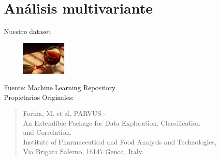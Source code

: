 \documentclass[xcolor=table]{beamer}
\begin{document}
\section{Análisis multivariante}
\begin{frame}{Nuestro dataset}

\begin{table}[]
\end{table}
\begin{figure}
\centering
\includegraphics[width=0.2\textwidth]{vino.jpg}
\end{figure}
{Fuente: Machine Learning Repository\\
Propietarios Originales: }\begin{quote}\scriptsize Forina, M. et al, PARVUS -\\
An Extendible Package for Data Exploration, Classification \\and Correlation.\\
Institute of Pharmaceutical and Food Analysis and Technologies, \\Via Brigata Salerno,
16147 Genoa, Italy.\end{quote}
\end{frame}
\end{document}

